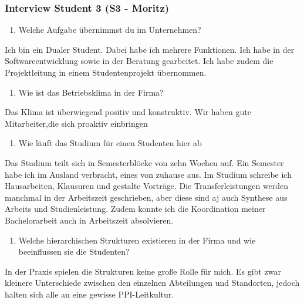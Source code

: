 \documentclass[
  12pt,
  ngerman,
  a4paper,
]{article}
\providecommand{\tightlist}{%
  \setlength{\itemsep}{0pt}\setlength{\parskip}{0pt}}
\begin{document}
\hypertarget{interview-student-3-s3---moritz}{%
\subsubsection{Interview Student 3 (S3 -
Moritz)}\label{interview-student-3-s3---moritz}}

\begin{enumerate}
\def\labelenumi{\arabic{enumi}.}
\tightlist
\item
  Welche Aufgabe übernimmst du im Unternehmen?
\end{enumerate}

Ich bin ein Dualer Student. Dabei habe ich mehrere Funktionen. Ich habe
in der Softwareentwicklung sowie in der Beratung gearbeitet. Ich habe
zudem die Projektleitung in einem Studentenprojekt übernommen.

\begin{enumerate}
\def\labelenumi{\arabic{enumi}.}
\setcounter{enumi}{1}
\tightlist
\item
  Wie ist das Betriebsklima in der Firma?
\end{enumerate}

Das Klima ist überwiegend positiv und konstruktiv. Wir haben gute
Mitarbeiter,die sich proaktiv einbringen

\begin{enumerate}
\def\labelenumi{\arabic{enumi}.}
\setcounter{enumi}{2}
\tightlist
\item
  Wie läuft das Studium für einen Studenten hier ab
\end{enumerate}

Das Studium teilt sich in Semesterblöcke von zehn Wochen auf. Ein
Semester habe ich im Ausland verbracht, eines von zuhause aus. Im
Studium schreibe ich Hausarbeiten, Klausuren und gestalte Vorträge. Die
Transferleistungen werden manchmal in der Arbeitszeit geschrieben, aber
diese sind aj auch Synthese aus Arbeits und Studienleistung. Zudem
konnte ich die Koordination meiner Bachelorarbeit auch in Arbeitszeit
absolvieren.

\begin{enumerate}
\def\labelenumi{\arabic{enumi}.}
\setcounter{enumi}{3}
\tightlist
\item
  Welche hierarchischen Strukturen existieren in der Firma und wie
  beeinflussen sie die Studenten?
\end{enumerate}

In der Praxis spielen die Strukturen keine große Rolle für mich. Es gibt
zwar kleinere Unterschiede zwischen den einzelnen Abteilungen und
Standorten, jedoch halten sich alle an eine gewisse PPI-Leitkultur.
\end{document}
